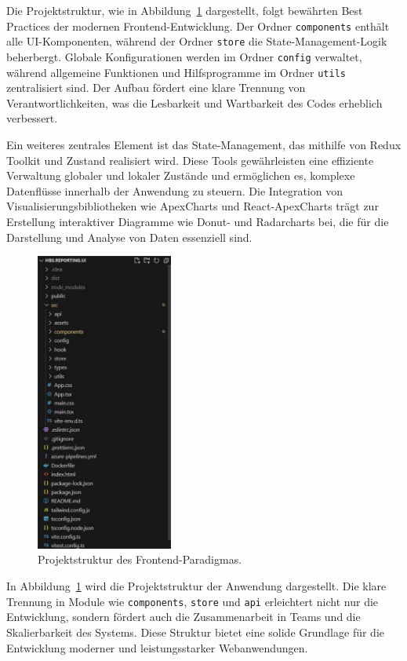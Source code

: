 Die Projektstruktur, wie in Abbildung~\ref{fig:frontend_code_paradigm} dargestellt, folgt bewährten Best Practices der modernen Frontend-Entwicklung. Der Ordner \texttt{components} enthält alle UI-Komponenten, während der Ordner \texttt{store} die State-Management-Logik beherbergt. Globale Konfigurationen werden im Ordner \texttt{config} verwaltet, während allgemeine Funktionen und Hilfsprogramme im Ordner \texttt{utils} zentralisiert sind. Der Aufbau fördert eine klare Trennung von Verantwortlichkeiten, was die Lesbarkeit und Wartbarkeit des Codes erheblich verbessert.

Ein weiteres zentrales Element ist das State-Management, das mithilfe von Redux Toolkit und Zustand realisiert wird. Diese Tools gewährleisten eine effiziente Verwaltung globaler und lokaler Zustände und ermöglichen es, komplexe Datenflüsse innerhalb der Anwendung zu steuern. Die Integration von Visualisierungsbibliotheken wie ApexCharts und React-ApexCharts trägt zur Erstellung interaktiver Diagramme wie Donut- und Radarcharts bei, die für die Darstellung und Analyse von Daten essenziell sind.

\begin{figure}[H]
    \centering
    \includegraphics[width=0.4\textwidth, keepaspectratio]{images/frontendparadigma.jpg}
    \caption{Projektstruktur des Frontend-Paradigmas.}
    \label{fig:frontend_code_paradigm}
\end{figure}

In Abbildung~\ref{fig:frontend_code_paradigm} wird die Projektstruktur der Anwendung dargestellt. Die klare Trennung in Module wie \texttt{components}, \texttt{store} und \texttt{api} erleichtert nicht nur die Entwicklung, sondern fördert auch die Zusammenarbeit in Teams und die Skalierbarkeit des Systems. Diese Struktur bietet eine solide Grundlage für die Entwicklung moderner und leistungsstarker Webanwendungen.


